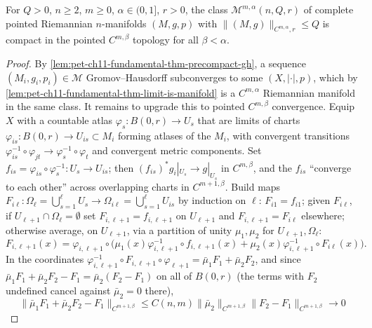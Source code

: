\begin{theorem}
  \label{thm:pet-ch11-fundamental-theorem-convergence}
  For $Q>0$, $n\ge2$, $m\ge0$, $\alpha\in(0,1]$, $r>0$, the class
  $\mathcal{M}^{m,\alpha}(n,Q,r)$ of complete pointed Riemannian $n$-manifolds
  $(M,g,p)$ with $\|(M,g)\|_{C^{m,\alpha},r}\le Q$ is compact in the pointed
  $C^{m,\beta}$ topology for all $\beta<\alpha$.
\end{theorem}
\begin{proof}
  By \cref{lem:pet-ch11-fundamental-thm-precompact-gh}, a sequence
  $(M_i,g_i,p_i)\in\mathcal{M}$ Gromov--Hausdorff subconverges to some
  $(X,|\cdot|,p)$, which by \cref{lem:pet-ch11-fundamental-thm-limit-is-manifold}
  is a $C^{m,\alpha}$ Riemannian manifold in the same class. It remains to
  upgrade this to pointed $C^{m,\beta}$ convergence. Equip $X$ with a
  countable atlas $\varphi_s:B(0,r)\to U_s$ that are limits of charts
  $\varphi_{is}:B(0,r)\to U_{is}\subset M_i$ forming atlases of the $M_i$,
  with convergent transitions $\varphi_{is}^{-1}\circ\varphi_{jt}\to\varphi_s^{-1}\circ\varphi_t$
  and convergent metric components. Set
  $f_{is}=\varphi_{is}\circ\varphi_s^{-1}:U_s\to U_{is}$; then
  $(f_{is})^*g_i|_{U_s}\to g|_{U_s}$ in $C^{m,\beta}$, and the $f_{is}$
  ``converge to each other'' across overlapping charts in $C^{m+1,\beta}$.
  Build maps $F_{i\ell}:\Omega_\ell=\bigcup_{s=1}^\ell U_s\to\Omega_{i\ell}=\bigcup_{s=1}^\ell U_{is}$
  by induction on $\ell$: $F_{i1}=f_{i1}$; given $F_{i\ell}$, if
  $U_{\ell+1}\cap\Omega_\ell=\emptyset$ set $F_{i,\ell+1}=f_{i,\ell+1}$ on
  $U_{\ell+1}$ and $F_{i,\ell+1}=F_{i\ell}$ elsewhere; otherwise average, on
  $U_{\ell+1}$, via a partition of unity $\mu_1,\mu_2$ for $U_{\ell+1},\Omega_\ell$:
  \[
    F_{i,\ell+1}(x)=\varphi_{i,\ell+1}\circ\big(\mu_1(x)\varphi_{i,\ell+1}^{-1}\circ f_{i,\ell+1}(x)
    +\mu_2(x)\varphi_{i,\ell+1}^{-1}\circ F_{i\ell}(x)\big).
  \]
  In the coordinates $\varphi_{i,\ell+1}^{-1}\circ F_{i,\ell+1}\circ\varphi_{\ell+1}=\bar\mu_1F_1+\bar\mu_2F_2$,
  and since $\bar\mu_1F_1+\bar\mu_2F_2-F_1=\bar\mu_2(F_2-F_1)$ on all of
  $B(0,r)$ (the terms with $F_2$ undefined cancel against $\bar\mu_2=0$
  there),
  \[
    \|\bar\mu_1F_1+\bar\mu_2F_2-F_1\|_{C^{m+1,\beta}}\le C(n,m)\|\bar\mu_2\|_{C^{m+1,\beta}}\|F_2-F_1\|_{C^{m+1,\beta}}\to0
\]
\end{proof}
